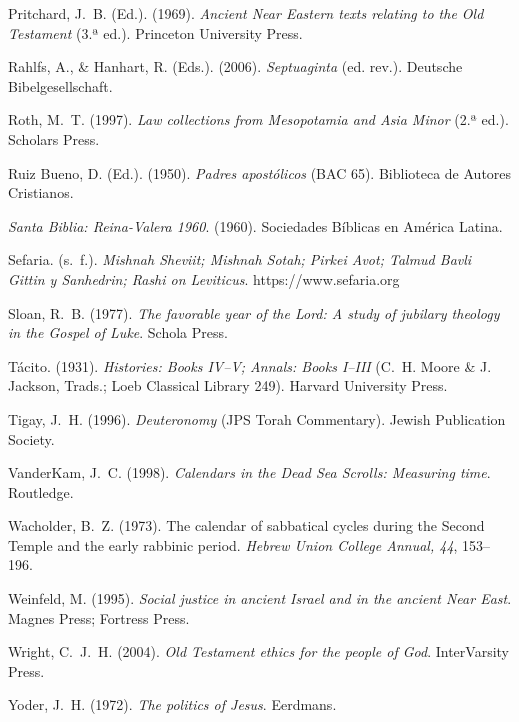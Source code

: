 \documentclass[11pt,letterpaper]{article}
\newcommand{\refapa}[1]{\par{\RaggedRight\hangindent=1.27cm\hangafter=1\noindent #1\par}\vspace{4pt}}
\begin{document}
\refapa{Pritchard, J.~B. (Ed.). (1969). \emph{Ancient Near Eastern texts relating to the Old Testament} (3.ª ed.). Princeton University Press.}
\refapa{Rahlfs, A., \& Hanhart, R. (Eds.). (2006). \emph{Septuaginta} (ed. rev.). Deutsche Bibelgesellschaft.}
\refapa{Roth, M.~T. (1997). \emph{Law collections from Mesopotamia and Asia Minor} (2.ª ed.). Scholars Press.}
\refapa{Ruiz Bueno, D. (Ed.). (1950). \emph{Padres apostólicos} (BAC 65). Biblioteca de Autores Cristianos.}
\refapa{\emph{Santa Biblia: Reina-Valera 1960}. (1960). Sociedades Bíblicas en América Latina.}
\refapa{Sefaria. (s.~f.). \emph{Mishnah Sheviit; Mishnah Sotah; Pirkei Avot; Talmud Bavli Gittin y Sanhedrin; Rashi on Leviticus}. https://www.sefaria.org}
\refapa{Sloan, R.~B. (1977). \emph{The favorable year of the Lord: A study of jubilary theology in the Gospel of Luke}. Schola Press.}
\refapa{Tácito. (1931). \emph{Histories: Books IV--V; Annals: Books I--III} (C.~H. Moore \& J. Jackson, Trads.; Loeb Classical Library 249). Harvard University Press.}
\refapa{Tigay, J.~H. (1996). \emph{Deuteronomy} (JPS Torah Commentary). Jewish Publication Society.}
\refapa{VanderKam, J.~C. (1998). \emph{Calendars in the Dead Sea Scrolls: Measuring time}. Routledge.}
\refapa{Wacholder, B.~Z. (1973). The calendar of sabbatical cycles during the Second Temple and the early rabbinic period. \emph{Hebrew Union College Annual, 44}, 153--196.}
\refapa{Weinfeld, M. (1995). \emph{Social justice in ancient Israel and in the ancient Near East}. Magnes Press; Fortress Press.}
\refapa{Wright, C.~J.~H. (2004). \emph{Old Testament ethics for the people of God}. InterVarsity Press.}
\refapa{Yoder, J.~H. (1972). \emph{The politics of Jesus}. Eerdmans.}
\end{document}
